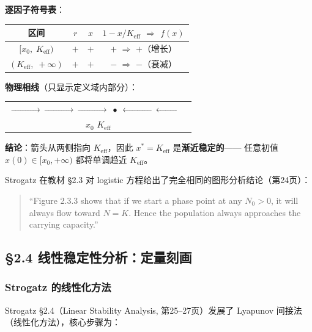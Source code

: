 \documentclass[12pt,a4paper]{article}
\begin{document}
\textbf{逐因子符号表}：

\begin{center}
\begin{tabular}{c|c|c|c}
\toprule
区间 & $r$ & $x$ & $1 - x/K_{\text{eff}}$ \quad $\Rightarrow$ \quad $f(x)$ \\
\midrule
$[x_0,\; K_{\text{eff}})$ & $+$ & $+$ & $+$ \quad $\Rightarrow$ \quad $+$（增长） \\
$(K_{\text{eff}},\; +\infty)$ & $+$ & $+$ & $-$ \quad $\Rightarrow$ \quad $-$（衰减） \\
\bottomrule
\end{tabular}
\end{center}

\textbf{物理相线}（只显示定义域内部分）：

\begin{center}
\begin{tabular}{c}
$\xrightarrow{\hspace{2cm}} \xrightarrow{\hspace{2cm}} \xrightarrow{\hspace{2cm}}
\;\bullet\; \xleftarrow{\hspace{2cm}} \xleftarrow{\hspace{2cm}}$ \\[4pt]
$x_0$ \hspace{3.5cm} $K_{\text{eff}}$ \hspace{3.5cm}
\end{tabular}
\end{center}

\textbf{结论}：箭头从两侧指向 $K_{\text{eff}}$，因此 $x^* = K_{\text{eff}}$ 是\textbf{渐近稳定的}——
任意初值 $x(0) \in [x_0, +\infty)$ 都将单调趋近 $K_{\text{eff}}$。

Strogatz 在教材 \S2.3 对 logistic 方程给出了完全相同的图形分析结论（第24页）：
\begin{quote}
\small
``Figure 2.3.3 shows that if we start a phase point at any $N_0 > 0$, it will always flow
toward $N = K$. Hence the population always approaches the carrying capacity.''
\end{quote}

\subsection{\S2.4 线性稳定性分析：定量刻画}

\subsubsection{Strogatz 的线性化方法}
Strogatz \S2.4（Linear Stability Analysis, 第25--27页）发展了 Lyapunov 间接法
（线性化方法），核心步骤为：
\end{document}
